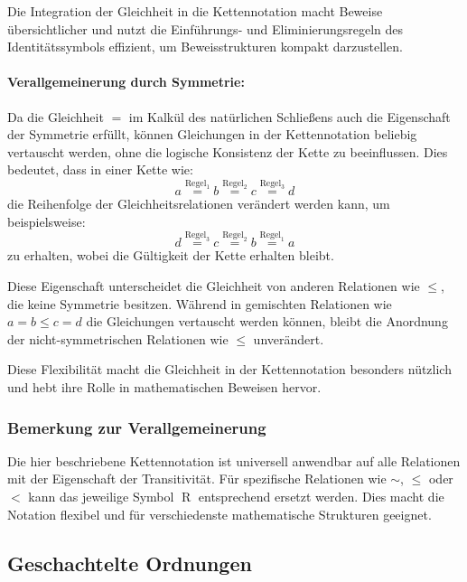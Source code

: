 \documentclass{book}
\theoremstyle{plain}
\theoremstyle{remark}
\theoremstyle{definition}
\begin{document}
Die Integration der Gleichheit in die Kettennotation macht Beweise übersichtlicher und nutzt die Einführungs- und Eliminierungsregeln des Identitätssymbols effizient, um Beweisstrukturen kompakt darzustellen.

\paragraph{Verallgemeinerung durch Symmetrie:}  
Da die Gleichheit \(=\) im Kalkül des natürlichen Schließens auch die Eigenschaft der Symmetrie erfüllt, können Gleichungen in der Kettennotation beliebig vertauscht werden, ohne die logische Konsistenz der Kette zu beeinflussen. Dies bedeutet, dass in einer Kette wie:
\[
a \stackrel{\text{Regel}_1}{=} b \stackrel{\text{Regel}_2}{=} c \stackrel{\text{Regel}_3}{=} d
\]
die Reihenfolge der Gleichheitsrelationen verändert werden kann, um beispielsweise:
\[
d \stackrel{\text{Regel}_3}{=} c \stackrel{\text{Regel}_2}{=} b \stackrel{\text{Regel}_1}{=} a
\]
zu erhalten, wobei die Gültigkeit der Kette erhalten bleibt.

Diese Eigenschaft unterscheidet die Gleichheit von anderen Relationen wie \(\leq\), die keine Symmetrie besitzen. Während in gemischten Relationen wie \(a = b \leq c = d\) die Gleichungen vertauscht werden können, bleibt die Anordnung der nicht-symmetrischen Relationen wie \(\leq\) unverändert. 

Diese Flexibilität macht die Gleichheit in der Kettennotation besonders nützlich und hebt ihre Rolle in mathematischen Beweisen hervor.

\subsubsection*{Bemerkung zur Verallgemeinerung}

Die hier beschriebene Kettennotation ist universell anwendbar auf alle Relationen mit der Eigenschaft der Transitivität. Für spezifische Relationen wie \(\sim\), \(\leq\) oder \(<\) kann das jeweilige Symbol \(\mathrel{R}\) entsprechend ersetzt werden. Dies macht die Notation flexibel und für verschiedenste mathematische Strukturen geeignet.

\subsection{Geschachtelte Ordnungen}
\end{document}
